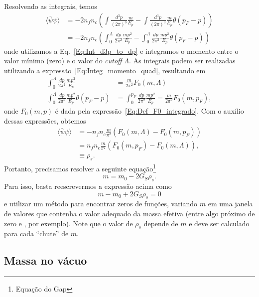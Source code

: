 Resolvendo as integrais, temos
\begin{align}
	\langle\bar{\psi}\psi\rangle &= - 2 n_f n_c \left(\int\frac{d^3p}{(2\pi)^3}\frac{m}{E_p} - \int\frac{d^3p}{(2\pi)^3} \frac{m}{E_p} \theta(p_F - p)\right) \\
	&= - 2 n_f n_c \left(\int_0^\Lambda\frac{dp}{2\pi^2} \frac{mp^2}{E_p} - \int_0^\Lambda \frac{dp}{2\pi^2} \frac{mp^2}{E_p} \theta(p_F - p)\right)
\end{align}
%
onde utilizamos a Eq.~\ref{Eq:Int_d3p_to_dp} e integramos o momento entre o valor mínimo (zero) e o valor do \emph{cutoff} $\Lambda$. As integrais podem ser realizadas utilizando a expressão~\eqref{Eq:Integ_momento_quad}, resultando em
\begin{align}
	\int_0^\Lambda \frac{dp}{2\pi^2} \frac{mp^2}{E_p} &= \frac{m}{2\pi^2} F_0(m,\Lambda)\\
	\int_0^\Lambda \frac{dp}{2\pi^2} \frac{mp^2}{E_p} \theta(p_F - p) &= \int_0^{p_F} \frac{dp}{2\pi^2} \frac{mp^2}{E_p} = \frac{m}{2\pi^2} F_0(m,p_F),
\end{align}
%
onde $F_0(m, p)$ é dada pela expressão~\eqref{Eq:Def_F0_integrado}. Com o auxílio dessas expressões, obtemos
\begin{align}
	\langle\bar{\psi}\psi\rangle &= - n_f n_c \frac{m}{\pi^2} (F_0(m,\Lambda) - F_0(m, p_F)) \label{Eq:Dens_Escalar_NJL_Gv_0}\\
	&= n_f n_c \frac{m}{\pi^2} (F_0(m,p_F) - F_0(m, \Lambda)), \\
	&\equiv \rho_s.
\end{align}
%
Portanto, precisamos resolver a seguinte equação\footnote{Equação do Gap}
\begin{equation}\label{Eq:Eq_Gap_NJL}
m = m_0 - 2 G_S\rho_s.
\end{equation}
%
Para isso, basta reescrevermos a expressão acima como
\begin{equation}
	m - m_0 + 2 G_S\rho_s = 0
\end{equation}
%
e utilizar um método para encontrar zeros de funções, variando $m$ em uma janela de valores que contenha o valor adequado da massa efetiva (entre algo próximo de zero e , por exemplo). Note que o valor de $\rho_s$ depende de $m$ e deve ser calculado para cada ``chute'' de $m$.

\subsection{Massa no vácuo}

